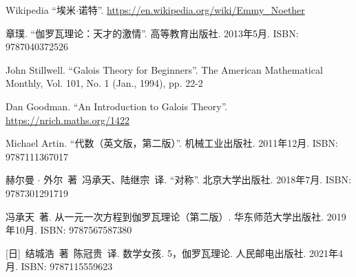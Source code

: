 \documentclass[b5paper]{ctexart}
\begin{document}
\begin{thebibliography}{99}
Wikipedia ``埃米$\cdot$诺特''. \url{https://en.wikipedia.org/wiki/Emmy_Noether}

章璞. ``伽罗瓦理论：天才的激情''. 高等教育出版社. 2013年5月. ISBN: 9787040372526

John Stillwell. ``Galois Theory for Beginners''. The American Mathematical Monthly, Vol. 101, No. 1 (Jan., 1994), pp. 22-2

Dan Goodman. ``An Introduction to Galois Theory''. \url{https://nrich.maths.org/1422}

Michael Artin. ``代数（英文版，第二版）''. 机械工业出版社. 2011年12月. ISBN: 9787111367017

赫尔曼 $\cdot$ 外尔\ 著\ 冯承天、陆继宗\ 译. ``对称''. 北京大学出版社. 2018年7月. ISBN: 9787301291719

冯承天\ 著. {从一元一次方程到伽罗瓦理论}（第二版）. 华东师范大学出版社. 2019年10月. ISBN: 9787567587380

[日]\ 结城浩\ 著\ 陈冠贵\ 译. {数学女孩. 5，伽罗瓦理论}. 人民邮电出版社. 2021年4月. ISBN: 9787115559623

\end{thebibliography}

\expandafter\enddocument

\fi
\end{document}
